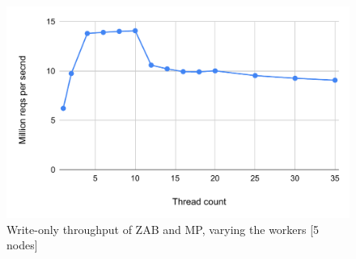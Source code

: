 \begin{figure}[t]
  \centering
  \includegraphics[scale=0.4]{1_figures/ZAB-scal.pdf}
  \caption{Write-only throughput of ZAB and MP, varying the workers [5 nodes]}
  \label{fig:zab-scal}
\end{figure}